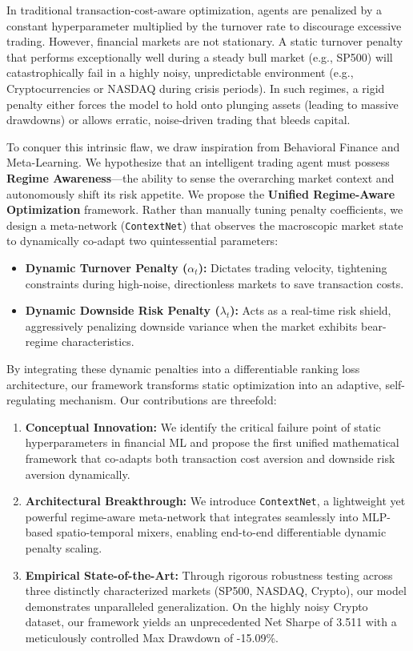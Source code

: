 \documentclass[letterpaper]{article} %
\begin{document}
In traditional transaction-cost-aware optimization, agents are penalized by a constant hyperparameter multiplied by the turnover rate to discourage excessive trading. However, financial markets are not stationary. A static turnover penalty that performs exceptionally well during a steady bull market (e.g., SP500) will catastrophically fail in a highly noisy, unpredictable environment (e.g., Cryptocurrencies or NASDAQ during crisis periods). In such regimes, a rigid penalty either forces the model to hold onto plunging assets (leading to massive drawdowns) or allows erratic, noise-driven trading that bleeds capital.

To conquer this intrinsic flaw, we draw inspiration from Behavioral Finance and Meta-Learning. We hypothesize that an intelligent trading agent must possess \textbf{Regime Awareness}---the ability to sense the overarching market context and autonomously shift its risk appetite. We propose the \textbf{Unified Regime-Aware Optimization} framework. Rather than manually tuning penalty coefficients, we design a meta-network (\texttt{ContextNet}) that observes the macroscopic market state to dynamically co-adapt two quintessential parameters:
\begin{itemize}
    \item \textbf{Dynamic Turnover Penalty ($\alpha_t$):} Dictates trading velocity, tightening constraints during high-noise, directionless markets to save transaction costs.
    \item \textbf{Dynamic Downside Risk Penalty ($\lambda_t$):} Acts as a real-time risk shield, aggressively penalizing downside variance when the market exhibits bear-regime characteristics.
\end{itemize}

By integrating these dynamic penalties into a differentiable ranking loss architecture, our framework transforms static optimization into an adaptive, self-regulating mechanism. Our contributions are threefold:
\begin{enumerate}
    \item \textbf{Conceptual Innovation:} We identify the critical failure point of static hyperparameters in financial ML and propose the first unified mathematical framework that co-adapts both transaction cost aversion and downside risk aversion dynamically.
    \item \textbf{Architectural Breakthrough:} We introduce \texttt{ContextNet}, a lightweight yet powerful regime-aware meta-network that integrates seamlessly into MLP-based spatio-temporal mixers, enabling end-to-end differentiable dynamic penalty scaling.
    \item \textbf{Empirical State-of-the-Art:} Through rigorous robustness testing across three distinctly characterized markets (SP500, NASDAQ, Crypto), our model demonstrates unparalleled generalization. On the highly noisy Crypto dataset, our framework yields an unprecedented Net Sharpe of 3.511 with a meticulously controlled Max Drawdown of -15.09\%.
\end{enumerate}
\end{document}
